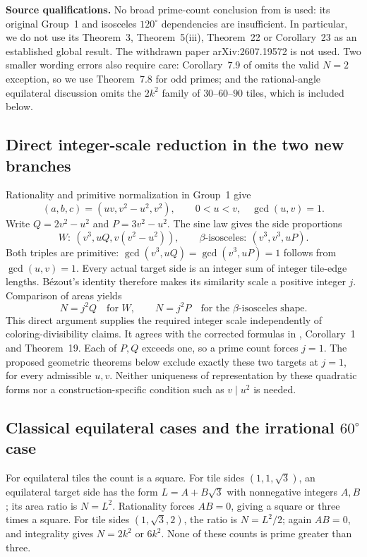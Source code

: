 \documentclass[
  11pt,
  a4paper,
]{article}
\begin{document}
\noindent\textbf{Source qualifications.} No broad prime-count conclusion
from \cite{prime} is used: its original Group~1 and isosceles
$120^\circ$ dependencies are insufficient. In particular, we do not use
its Theorem~3, Theorem~5(iii), Theorem~22 or Corollary~23 as an
established global result. The withdrawn paper arXiv:2607.19572 is not
used. Two smaller wording errors also require care: Corollary~7.9 of
\cite{isosceles} omits the valid $N=2$ exception, so we use
Theorem~7.8 for odd primes; and the rational-angle equilateral
discussion omits the $2k^2$ family of $30$--$60$--$90$ tiles, which is
included below.

\subsection{Direct integer-scale reduction in the two new branches}

Rationality and primitive normalization in Group~1 give
\[
(a,b,c)=(uv,v^2-u^2,v^2),\qquad
0<u<v,\quad\gcd(u,v)=1.
\]
Write $Q=2v^2-u^2$ and $P=3v^2-u^2$. The sine law gives the
side proportions
\[
W:\ (v^3,uQ,v(v^2-u^2)),\qquad
\beta\text{-isosceles}:\ (v^3,v^3,uP).
\]
Both triples are primitive: $\gcd(v^3,uQ)=\gcd(v^3,uP)=1$ follows
from $\gcd(u,v)=1$. Every actual target side is an integer sum of
integer tile-edge lengths. B\'ezout's identity therefore makes its
similarity scale a positive integer $j$. Comparison of areas yields
\[
N=j^2Q\quad\text{for }W,\qquad
N=j^2P\quad\text{for the }\beta\text{-isosceles shape}.
\]
This direct argument supplies the required integer scale independently
of coloring-divisibility claims. It agrees with the corrected formulas
in \cite{group1}, Corollary~1 and Theorem~19. Each of $P,Q$ exceeds
one, so a prime count forces $j=1$. The proposed geometric theorems
below exclude exactly these two targets at $j=1$, for every admissible
$u,v$. Neither uniqueness of representation by these quadratic forms
nor a construction-specific condition such as $v\mid u^2$ is needed.

\subsection{Classical equilateral cases and the irrational $60^\circ$ case}

For equilateral tiles the count is a square. For tile sides
$(1,1,\sqrt3)$, an equilateral target side has the form
$L=A+B\sqrt3$ with nonnegative integers $A,B$; its area ratio is
$N=L^2$. Rationality forces $AB=0$, giving a square or three times a
square. For tile sides $(1,\sqrt3,2)$, the ratio is $N=L^2/2$;
again $AB=0$, and integrality gives $N=2k^2$ or $6k^2$. None of
these counts is prime greater than three.
\end{document}

